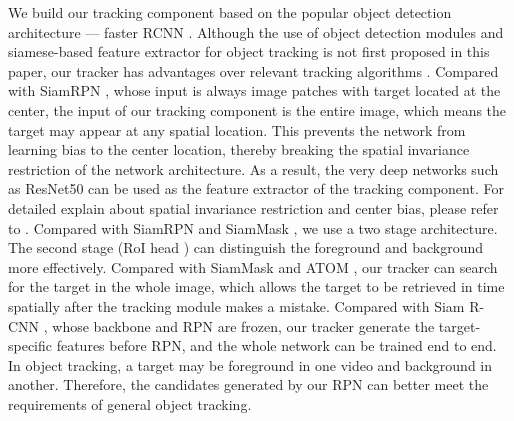 We build our tracking component based on the popular object detection architecture --- faster RCNN \cite{ren2015faster}. Although the use of object detection modules and siamese-based feature extractor for object tracking is not first proposed in this paper, our tracker has advantages over relevant tracking algorithms \cite{SiamRPN, Wang2018SiamMask, danelljan2019atom, voigtlaender2019siam}. Compared with SiamRPN \cite{SiamRPN}, whose input is always image patches with target located at the center, the input of our tracking component is the entire image, which means the target may appear at any spatial location. This prevents the network from learning bias to the center location, thereby breaking the spatial invariance restriction \cite{SiamRPN++} of the network architecture. As a result, the very deep networks such as ResNet50 \cite{he2016deep} can be used as the feature extractor of the tracking component. For detailed explain about spatial invariance restriction and center bias, please refer to \cite{SiamRPN++}.
Compared with SiamRPN \cite{SiamRPN} and SiamMask \cite{Wang2018SiamMask}, we use a two stage architecture. The second stage (RoI head \cite{ren2015faster}) can distinguish the foreground and background more effectively.
Compared with SiamMask \cite{Wang2018SiamMask} and ATOM \cite{danelljan2019atom}, our tracker can search for the target in the whole image, which allows the target to be retrieved in time spatially after the tracking module makes a mistake.
Compared with Siam R-CNN \cite{voigtlaender2019siam}, whose backbone and RPN are frozen, our tracker generate the target-specific features before RPN, and the whole network can be trained end to end. In object tracking, a target may be foreground in one video and background in another. Therefore, the candidates generated by our RPN can better meet the requirements of general object tracking.

